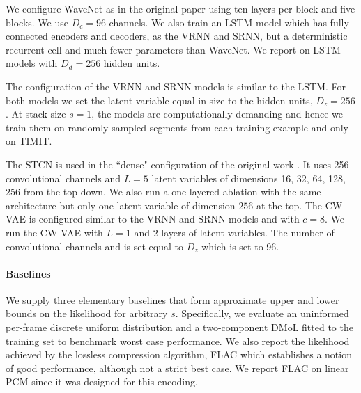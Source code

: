 We configure WaveNet as in the original paper using ten layers per block and five blocks. We use $D_c=96$ channels. 
We also train an LSTM model \cite{hochreiter_long_1997} which has fully connected encoders and decoders, as the VRNN and SRNN, but a deterministic recurrent cell and much fewer parameters than WaveNet. We report on LSTM models with $D_d=256$ hidden units. 

The configuration of the VRNN and SRNN models is similar to the LSTM. For both models we set the latent variable equal in size to the hidden units, $D_z=256$. At stack size $s=1$, the models are computationally demanding and hence we train them on randomly sampled segments from each training example and only on TIMIT.

The STCN is used in the ``dense" configuration of the original work \cite{aksan_stcn_2019}. It uses 256 convolutional channels and $L=5$ latent variables of dimensions 16, 32, 64, 128, 256 from the top down. We also run a one-layered ablation with the same architecture but only one latent variable of dimension $256$ at the top. 
The CW-VAE is configured similar to the VRNN and SRNN models and with $c=8$. 
We run the CW-VAE with $L=1$ and $2$ layers of latent variables. 
The number of convolutional channels and is set equal to $D_z$ which is set to 96.
%
\paragraph{Baselines} We supply three elementary baselines that form approximate upper and lower bounds on the likelihood for arbitrary $s$. Specifically, we evaluate an uninformed per-frame discrete uniform distribution and a two-component DMoL fitted to the training set to benchmark worst case performance. 
We also report the likelihood achieved by the lossless compression algorithm, FLAC \cite{coalson_free_2019} which establishes a notion of good performance, although not a strict best case. We report FLAC on linear PCM since it was designed for this encoding.


